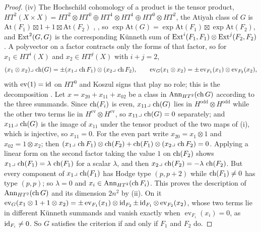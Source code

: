 \begin{proof}
(iv) The Hochschild cohomology of a product is the tensor product,
$HT^{2}(X\times X)=HT^{2}\otimes HT^{0}\oplus HT^{1}\otimes HT^{1}\oplus
HT^{0}\otimes HT^{2}$, the Atiyah class of $G$ is
$\mathrm{At}(F_{1})\boxtimes1+1\boxtimes\mathrm{At}(F_{2})$ \cite[Proposition 3.14]{BF03},
\cite[(8.4.1)]{Mar25a}, so $\exp\mathrm{At}(G)=\exp\mathrm{At}(F_{1})\boxtimes
\exp\mathrm{At}(F_{2})$, and $\operatorname{Ext}^{2}(G,G)$ is the corresponding K\"unneth
sum of $\operatorname{Ext}^{i}(F_{1},F_{1})\otimes\operatorname{Ext}^{j}(F_{2},F_{2})$. A polyvector on a
factor contracts only the forms of that factor, so for $x_{1}\in HT^{i}(X)$
and $x_{2}\in HT^{j}(X)$ with $i+j=2$,
\[
  (x_{1}\otimes x_{2})\lrcorner\,\operatorname{ch}(G)=\pm(x_{1}\lrcorner\,\operatorname{ch} F_{1})\otimes
  (x_{2}\lrcorner\,\operatorname{ch} F_{2}),\qquad
  \operatorname{ev}_{G}(x_{1}\otimes x_{2})=\pm\operatorname{ev}_{F_{1}}(x_{1})
  \otimes\operatorname{ev}_{F_{2}}(x_{2}),
\]
with $\operatorname{ev}(1)=\operatorname{id}$ on $HT^{0}$ and Koszul signs that play no
role; this is the decomposition \cite[(8.4.2), (8.4.3)]{Mar25a}. Let
$x=x_{20}+x_{11}+x_{02}$ be a class in $\operatorname{Ann}_{HT^{2}}(\operatorname{ch} G)$ according to the
three summands. Since $\operatorname{ch}(F_{i})$ is even, $x_{11}\lrcorner\,\operatorname{ch}(G)$ lies in
$H^{\mathrm{odd}}\otimes H^{\mathrm{odd}}$ while the other two terms lie in
$H^{\mathrm{ev}}\otimes H^{\mathrm{ev}}$, so $x_{11}\lrcorner\,\operatorname{ch}(G)=0$
separately; and $x_{11}\lrcorner\,\operatorname{ch}(G)$ is the image of $x_{11}$ under the
tensor product of the two maps of (i), which is injective, so $x_{11}=0$. For
the even part write $x_{20}=x_{1}\otimes1$ and $x_{02}=1\otimes x_{2}$; then
$(x_{1}\lrcorner\,\operatorname{ch} F_{1})\otimes\operatorname{ch}(F_{2})+\operatorname{ch}(F_{1})\otimes(x_{2}\lrcorner\,\operatorname{ch} F_{2})=0$.
Applying a linear form on the second factor taking the value $1$ on
$\operatorname{ch}(F_{2})$ shows $x_{1}\lrcorner\,\operatorname{ch}(F_{1})=\lambda\,\operatorname{ch}(F_{1})$ for a
scalar $\lambda$, and then $x_{2}\lrcorner\,\operatorname{ch}(F_{2})=-\lambda\,\operatorname{ch}(F_{2})$.
But every component of $x_{1}\lrcorner\,\operatorname{ch}(F_{1})$ has Hodge type $(p,p+2)$
while $\operatorname{ch}(F_{1})\ne0$ has type $(p,p)$; so $\lambda=0$ and
$x_{i}\in\operatorname{Ann}_{HT^{2}}(\operatorname{ch} F_{i})$. This proves the description of
$\operatorname{Ann}_{HT^{2}}(\operatorname{ch} G)$ and its dimension $2n^{2}$ by (ii). On it
$\operatorname{ev}_{G}(x_{1}\otimes1+1\otimes x_{2})=\pm\operatorname{ev}_{F_{1}}(x_{1})
\otimes\operatorname{id}_{F_{2}}\pm\operatorname{id}_{F_{1}}\otimes\operatorname{ev}_{F_{2}}(x_{2})$, whose
two terms lie in different K\"unneth summands and vanish exactly when
$\operatorname{ev}_{F_{i}}(x_{i})=0$, as $\operatorname{id}_{F_{i}}\ne0$. So $G$ satisfies
the criterion if and only if $F_{1}$ and $F_{2}$ do.


\end{proof}
